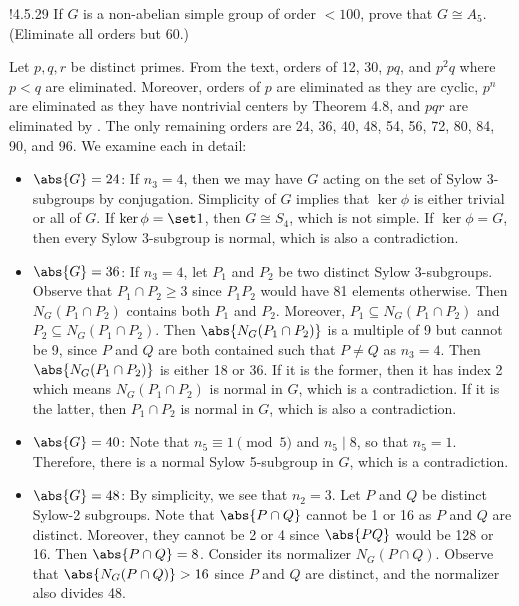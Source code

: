 \begin{exercise}!{4.5.29}
	If $G$ is a non-abelian simple group of order $< 100$, prove that $G \cong A_5$. (Eliminate all orders but 60.)
\end{exercise}

\begin{sol}
	Let $p, q, r$ be distinct primes.
	From the text, orders of 12, 30, $pq$, and $p^2q$ where $p < q$ are eliminated.
	Moreover, orders of $p$ are eliminated as they are cyclic, $p^n$ are eliminated as they have nontrivial centers by Theorem 4.8, and $pqr$ are eliminated by .
	The only remaining orders are 24, 36, 40, 48, 54, 56, 72, 80, 84, 90, and 96.
	We examine each in detail:
	\begin{itemize}
		\item $\abs{G} = 24$: If $n_3 = 4$, then we may have $G$ acting on the set of Sylow 3-subgroups by conjugation.
	Simplicity of $G$ implies that $\ker\phi$ is either trivial or all of $G$.
	If $\ker\phi = \set 1$, then $G \cong S_4$, which is not simple.
	If $\ker\phi = G$, then every Sylow 3-subgroup is normal, which is also a contradiction. 
		\item $\abs{G} = 36$: If $n_3 = 4$, let $P_1$ and $P_2$ be two distinct Sylow 3-subgroups.
	Observe that $P_1 \cap P_2 \geq 3$ since $P_1P_2$ would have 81 elements otherwise.
	Then $N_G(P_1 \cap P_2)$ contains both $P_1$ and $P_2$.
	Moreover, $P_1 \subseteq N_G(P_1 \cap P_2)$ and $P_2 \subseteq N_G(P_1 \cap P_2)$.
	Then $\abs{N_G(P_1 \cap P_2)}$ is a multiple of 9 but cannot be 9, since $P$ and $Q$ are both contained such that $P \neq Q$ as $n_3 = 4$.
	Then $\abs{N_G(P_1 \cap P_2)}$ is either 18 or 36.
	If it is the former, then it has index 2 which means $N_G(P_1 \cap P_2)$ is normal in $G$, which is a contradiction.
	If it is the latter, then $P_1 \cap P_2$ is normal in $G$, which is also a contradiction. 
		\item $\abs{G} = 40$: Note that $n_5 \equiv 1 \pmod 5$ and $n_5 \mid 8$, so that $n_5 = 1$.
	Therefore, there is a normal Sylow 5-subgroup in $G$, which is a contradiction.
		\item $\abs{G} = 48$: By simplicity, we see that $n_2 = 3$.
	Let $P$ and $Q$ be distinct Sylow-2 subgroups.
	Note that $\abs{P \cap Q}$ cannot be 1 or 16 as $P$ and $Q$ are distinct.
	Moreover, they cannot be 2 or 4 since $\abs{PQ}$ would be 128 or 16.
	Then $\abs{P \cap Q} = 8$.
	Consider its normalizer $N_G(P \cap Q)$.
	Observe that $\abs{N_G(P \cap Q)} > 16$ since $P$ and $Q$ are distinct, and the normalizer also divides 48.

\end{itemize}
\end{sol}
